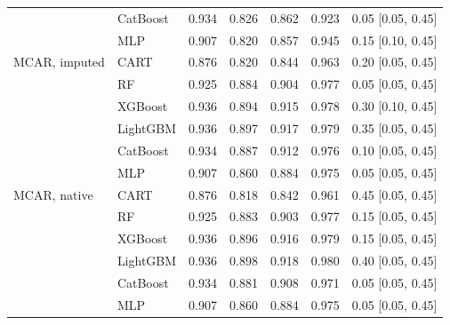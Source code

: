 \begin{table}[p]
\begin{tabular}{@{}llrrrrl@{}}
 & CatBoost & 0.934 & 0.826 & 0.862 & 0.923 & 0.05 [0.05, 0.45] \\
 & MLP & 0.907 & 0.820 & 0.857 & 0.945 & 0.15 [0.10, 0.45] \\
\midrule
MCAR, imputed & CART & 0.876 & 0.820 & 0.844 & 0.963 & 0.20 [0.05, 0.45] \\
 & RF & 0.925 & 0.884 & 0.904 & 0.977 & 0.05 [0.05, 0.45] \\
 & XGBoost & 0.936 & 0.894 & 0.915 & 0.978 & 0.30 [0.10, 0.45] \\
 & LightGBM & 0.936 & 0.897 & 0.917 & 0.979 & 0.35 [0.05, 0.45] \\
 & CatBoost & 0.934 & 0.887 & 0.912 & 0.976 & 0.10 [0.05, 0.45] \\
 & MLP & 0.907 & 0.860 & 0.884 & 0.975 & 0.05 [0.05, 0.45] \\
\midrule
MCAR, native & CART & 0.876 & 0.818 & 0.842 & 0.961 & 0.45 [0.05, 0.45] \\
 & RF & 0.925 & 0.883 & 0.903 & 0.977 & 0.15 [0.05, 0.45] \\
 & XGBoost & 0.936 & 0.896 & 0.916 & 0.979 & 0.15 [0.05, 0.45] \\
 & LightGBM & 0.936 & 0.898 & 0.918 & 0.980 & 0.40 [0.05, 0.45] \\
 & CatBoost & 0.934 & 0.881 & 0.908 & 0.971 & 0.05 [0.05, 0.45] \\
 & MLP & 0.907 & 0.860 & 0.884 & 0.975 & 0.05 [0.05, 0.45] \\
\bottomrule
\end{tabular}
\end{table}

